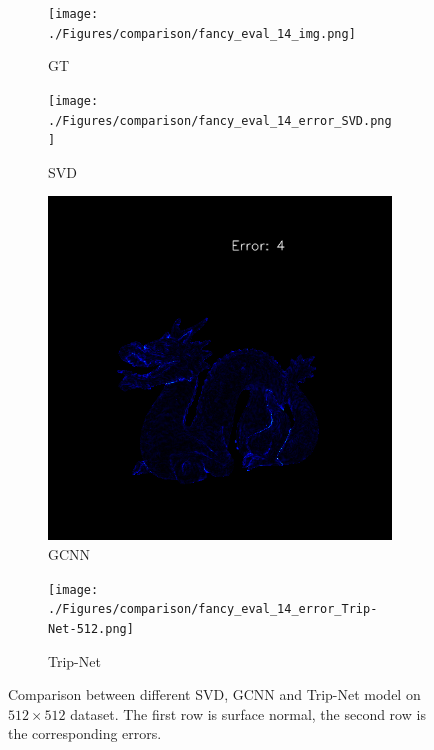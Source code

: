 \documentclass[border=15pt, multi, tikz]{article}
\begin{document}
\begin{figure}[H]
	
	\begin{subfigure}[b]{0.24\linewidth}
		\texttt{[image: ./Figures/comparison/fancy\_eval\_14\_img.png]}
		\caption{GT}
	\end{subfigure}
	\begin{subfigure}[b]{0.24\linewidth}
		\texttt{[image: ./Figures/comparison/fancy\_eval\_14\_error\_SVD.png]}
		\caption{SVD}
	\end{subfigure}
	\begin{subfigure}[b]{0.24\linewidth}
		\includegraphics[width=\linewidth]{./Figures/comparison/fancy_eval_14_error_GCNN-512-269.png}
		\caption{GCNN}
	\end{subfigure}
	\begin{subfigure}[b]{0.24\linewidth}
		\texttt{[image: ./Figures/comparison/fancy\_eval\_14\_error\_Trip-Net-512.png]}
		\caption{Trip-Net}
	\end{subfigure}

	
	
	\caption{Comparison between different SVD, GCNN and Trip-Net model on $ 512\times 512 $ dataset. The first row is surface normal, the second row is the corresponding errors. }
	\label{fig:high_resolution_eval}
\end{figure}
\end{document}
